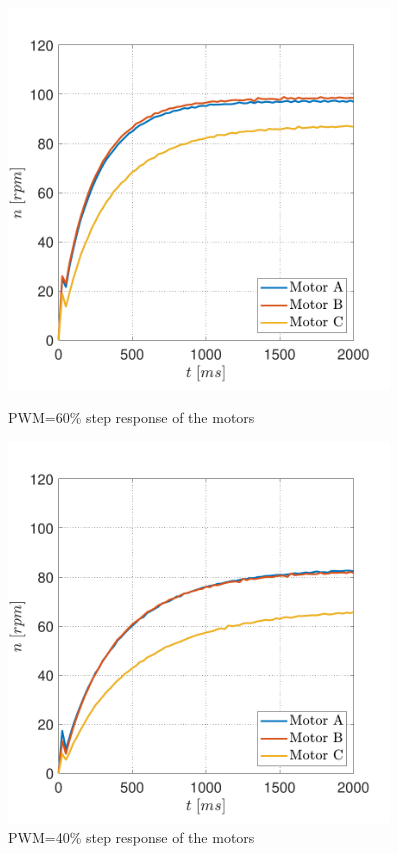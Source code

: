 \documentclass[12pt,english,twoside]{article}
\begin{document}
\begin{figure}[htb!]
	\centering
	\centering
	\includegraphics[width=0.9\textwidth]{figures/directed_speed_pwm_60}
	\caption{PWM=60\% step response of the motors}
	\endminipage\hfill
	\centering
	\includegraphics[width=0.9\textwidth]{figures/directed_speed_pwm_40}
	\caption{PWM=40\% step response of the motors}
	\label{mecanum}
	\endminipage\hfill
\end{figure}
\end{document}
